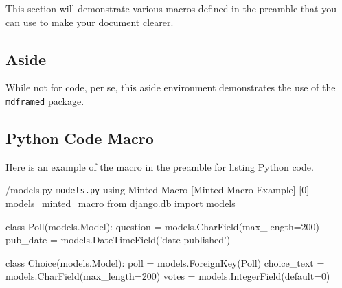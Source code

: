 
This section will demonstrate various macros defined in the preamble that you can use to make your document clearer.

\subsection{Aside}

While not for code, per se, this aside environment demonstrates the use of the \verb|mdframed| package.

\begin{aside}
\lipsum[65] %
\end{aside}

\subsection{Python Code Macro}
Here is an example of the macro in the preamble for listing Python code.

\begin{pycode}%
      {/models.py}
      {\texttt{models.py} using Minted Macro}%
      [Minted Macro Example]%
      [0]%
      {models_minted_macro}
from django.db import models

class Poll(models.Model):
    question = models.CharField(max_length=200)
    pub_date = models.DateTimeField('date published')

class Choice(models.Model):
    poll = models.ForeignKey(Poll)
    choice_text = models.CharField(max_length=200)
    votes = models.IntegerField(default=0)
\end{pycode}
